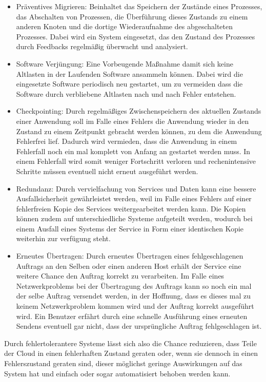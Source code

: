 \begin{itemize}
\item
Präventives Migrieren: Beinhaltet das Speichern der Zustände eines Prozesses, das Abschalten von Prozessen, die Überführung dieses Zustands zu einem anderen Knoten und die dortige Wiederaufnahme des abgeschalteten Prozesses.
Dabei wird ein System eingesetzt, das den Zustand des Prozesses durch Feedbacks regelmäßig überwacht und analysiert. 
\item
Software Verjüngung: Eine Vorbeugende Maßnahme damit sich keine Altlasten in der Laufenden Software ansammeln können. Dabei wird die eingesetzte Software periodisch neu gestartet, um zu vermeiden dass die Software durch verbliebene Altlasten nach und nach Fehler entstehen.
\item
Checkpointing: Durch regelmäßiges Zwischenspeichern des aktuellen Zustands einer Anwendung soll im Falle eines Fehlers die Anwendung wieder in den Zustand zu einem Zeitpunkt gebracht werden können, zu dem die Anwendung Fehlerfrei lief. Dadurch wird vermieden, dass die Anwendung in einem Fehlerfall noch ein mal komplett von Anfang an gestartet werden muss. In einem Fehlerfall wird somit weniger Fortschritt verloren und rechenintensive Schritte müssen eventuell nicht erneut ausgeführt werden.
\item
Redundanz: Durch vervielfachung von Services und Daten kann eine bessere Ausfallsicherheit gewährleistet werden, weil im Falle eines Fehlers auf einer fehlerfreien Kopie des Services weitergearbeitet werden kann. Die Kopien können zudem auf unterschiedliche Systeme aufgeteilt werden, wodurch bei einem Ausfall eines Systems der Service in Form einer identischen Kopie weiterhin zur verfügung steht.
\item
Erneutes Übertragen: Durch erneutes Übertragen eines fehlgeschlagenen Auftrags an den Selben oder einen anderen Host erhält der Service eine weitere Chance den Auftrag korrekt zu verarbeiten. Im Falle eines Netzwerkproblems bei der Übertragung des Auftrags kann so noch ein mal der selbe Auftrag versendet werden, in der Hoffnung, dass es dieses mal zu keinem Netzwerkproblem kommen wird und der Auftrag korrekt ausgeführt wird. Ein Benutzer erfährt durch eine schnelle Ausführung eines erneuten Sendens eventuell gar nicht, dass der ursprüngliche Auftrag fehlgeschlagen ist.
\end{itemize}

Durch fehlertolerantere Systeme lässt sich also die Chance reduzieren, dass Teile der Cloud in einen fehlerhaften Zustand geraten oder, wenn sie dennoch in einen Fehlerszustand geraten sind, dieser möglichst geringe Auswirkungen auf das System hat und einfach oder sogar automatisiert behoben werden kann.

